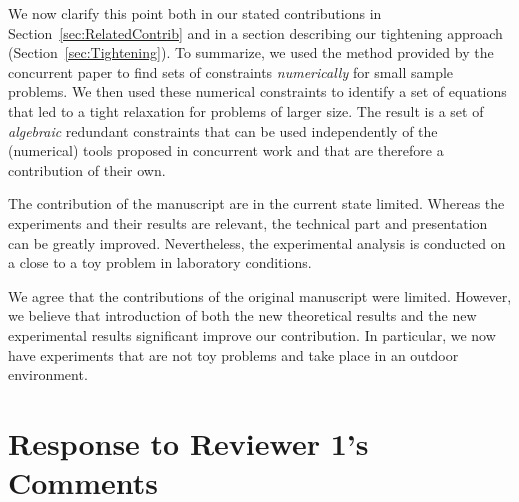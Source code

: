 \begin{response}
We now clarify this point both in our stated contributions in Section~\ref{sec:RelatedContrib} and in a section describing our tightening approach (Section~\ref{sec:Tightening}). To summarize, we used the method provided by the concurrent paper to find sets of constraints \emph{numerically} for small sample problems. We then used these numerical constraints to identify a set of equations that led to a tight relaxation for problems of larger size.
The result is a set of \emph{algebraic} redundant constraints that can be used independently of the (numerical) tools proposed in concurrent work and that are therefore a contribution of their own.
\end{response}

The contribution of the manuscript are in the current state limited.  Whereas the experiments and their results are relevant, the technical  part and presentation can be greatly improved. Nevertheless, the  experimental analysis is conducted on a close to a toy problem in  laboratory conditions.

\begin{response}
We agree that the contributions of the original manuscript were limited. However, we believe that introduction of both the new theoretical results and the new experimental results significant improve our contribution. In particular, we now have experiments that are not toy problems and take place in an outdoor environment.
\end{response}

\section*{Response to Reviewer 1's Comments}


